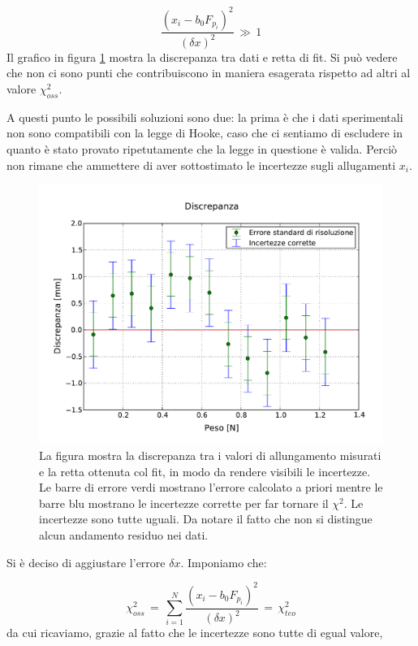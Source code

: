 \begin{equation*}
	\frac{(x_i - b_0 F_{p_i})^2}{(\delta x)^2} \, \gg \, 1
\end{equation*}
%
Il grafico in figura \ref{fig:discrepanza_statico} mostra la discrepanza tra dati e retta di fit.
Si può vedere che non ci sono punti che contribuiscono in maniera esagerata rispetto ad altri al valore $\chi^2_{oss}$.

A questi punto le possibili soluzioni sono due: la prima è che i dati sperimentali non sono compatibili con la legge di Hooke, caso che ci sentiamo di escludere in quanto è stato provato ripetutamente che la legge in questione è valida. Perciò non rimane che ammettere di aver sottostimato le incertezze sugli allugamenti $x_i$.

\begin{figure}
    \centering
    \includegraphics[width=120mm]{immagini/discrepanza_statico.pdf}
    \caption{La figura mostra la discrepanza tra i valori di allungamento misurati e la retta ottenuta col fit, in modo
        da rendere visibili le incertezze. Le barre di errore verdi mostrano l'errore calcolato a priori mentre
        le barre blu mostrano le incertezze corrette per far tornare il $\chi^2$. Le incertezze sono tutte uguali.
        Da notare il fatto che non si distingue alcun andamento residuo nei dati.}
    \label{fig:discrepanza_statico}
\end{figure}

Si è deciso di aggiustare l'errore $\delta x$. Imponiamo che:

\begin{equation*}
    \chi_{oss}^2 \,=\, \sum_{i=1}^{N} \frac{(x_i - b_0 F_{p_i})^2}{(\delta x)^2} \,=\, \chi_{teo}^2 
\end{equation*}
%
da cui ricaviamo, grazie al fatto che le incertezze sono tutte di egual valore,

